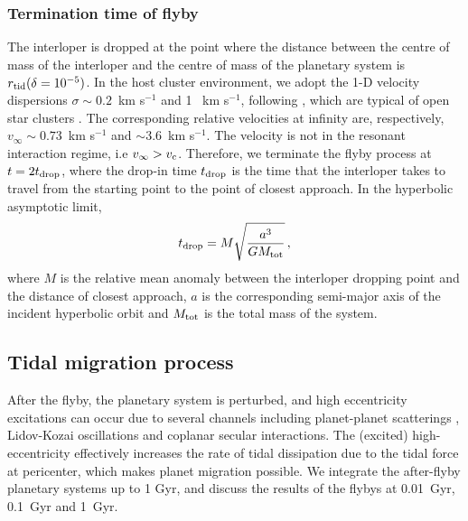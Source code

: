 \documentclass[twocolumn]{aastex63}
\begin{document}
\subsubsection{Termination time of flyby}
The interloper is dropped at the point where the distance between the centre of mass of the interloper and the centre of mass of the planetary system is $r_{\rm tid}(\delta=10^{-5})$. In the host cluster environment, we adopt the 1-D velocity dispersions $\sigma\sim 0.2$~km s$^{-1}$ and 1 ~km s$^{-1}$, following \citet{Shara2016}, which are typical of open star clusters \citep[e.g.][]{geller15,leigh16b}.  The corresponding relative velocities at infinity are, respectively, $v_\infty\sim 0.73$~km s$^{-1}$ and $\sim 3.6$~km s$^{-1}$. The velocity is not in the resonant interaction regime, i.e $v_\infty > v_{\rm c}$. Therefore, we terminate the flyby process at $t=2t_{\rm drop}$, where the drop-in time $t_{\rm drop}$ is the time that the interloper takes to travel from the starting point to the point of closest approach. In the hyperbolic asymptotic limit,
\begin{equation}
t_{\rm drop}=M\sqrt{\frac{a^3}{GM_{\rm tot}}}\,,
\end{equation}
where $M$ is the relative mean anomaly between the interloper dropping point and the distance of closest approach, $a$ is the corresponding semi-major axis of the incident hyperbolic orbit and $M_{\rm tot}$ is the total mass of the system.

\subsection{Tidal migration process}\label{sec:tidal}
After the flyby, the planetary system is perturbed, and high eccentricity excitations can occur due to several channels including planet-planet scatterings \citep{Rasio1996,Weidenschilling1996, Ford2006,Chatterjee2008}, Lidov-Kozai oscillations \citep{Wu2003, Fabrycky2007, Katz2011,Naoz2012,Petrovich2015,Naoz2011,Teyssandier2013} and coplanar secular interactions\citep{Li2014}. The (excited) high-eccentricity effectively increases the rate of tidal dissipation due to the tidal force at pericenter, which makes planet migration possible. We integrate the after-flyby planetary systems up to 1 Gyr, and discuss the results of the flybys at 0.01~Gyr, 0.1~Gyr and 1~Gyr.
\end{document}
